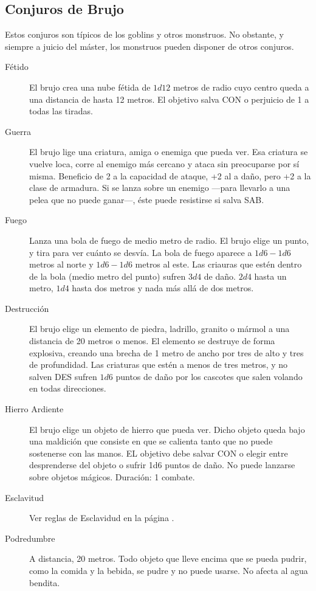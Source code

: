 \begin{multicols}{2}
\section{Conjuros de Brujo}

Estos conjuros son típicos de los goblins y otros monstruos. No obstante, y siempre
a juicio del máster, los monstruos pueden disponer de otros conjuros.

\begin{description}
\item[Fétido] El brujo crea una nube fétida de $1d12$ metros de radio cuyo centro queda a una distancia de hasta 12 metros. El objetivo salva CON o perjuicio de 1 a todas las tiradas.
\item[Guerra] El brujo lige una criatura, amiga o enemiga que pueda ver. Esa criatura se vuelve loca, corre al enemigo más cercano y ataca sin preocuparse por sí misma. Beneficio de 2 a la capacidad de ataque, +2 al a daño, pero +2 a la clase de armadura. Si se lanza sobre un enemigo ---para llevarlo a una pelea que no puede ganar---, éste puede resistirse si salva SAB.
\item[Fuego] Lanza una bola de fuego de medio metro de radio. El brujo elige un punto, y tira para ver cuánto se desvía. La bola de fuego aparece a $1d6-1d6$ metros al norte y $1d6-1d6$ metros al este.  Las criauras que estén dentro de la bola (medio metro del punto) sufren $3d4$ de daño. $2d4$ hasta un metro, $1d4$ hasta dos metros y nada más allá de dos metros.
\item[Destrucción] El brujo elige un elemento de piedra, ladrillo, granito o mármol a una distancia de 20 metros o menos. El elemento se destruye de forma explosiva, creando una brecha de 1 metro de ancho por tres de alto y tres de profundidad. Las criaturas que estén a menos de tres metros, y no salven DES sufren $1d6$ puntos de daño por los cascotes que salen volando en todas direcciones.
\item[Hierro Ardiente] El brujo elige un objeto de hierro que pueda ver. Dicho objeto queda bajo una maldición que consiste en que se calienta tanto que no puede sostenerse con las manos. EL objetivo debe salvar CON o elegir entre desprenderse del objeto o sufrir 1d6 puntos de daño. No puede lanzarse sobre objetos mágicos. Duración: 1 combate.
\item[Esclavitud] Ver reglas de Esclavidud en la página \pageref{s:esclavitud}.
\item[Podredumbre] A distancia, 20 metros. Todo objeto que lleve encima que se pueda pudrir, como la comida y la bebida, se pudre y no puede usarse. No afecta al agua bendita.

\end{description}
\end{multicols}
